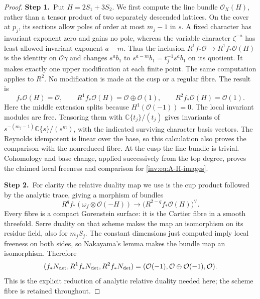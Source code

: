 \documentclass[11pt,a4paper]{article}
\theoremstyle{plain}
\theoremstyle{definition}
\begin{document}
\begin{proof}
\par\smallskip\noindent\textbf{Step 1.}\ Put $H=2S_1+3S_2$.  We first compute the line bundle $\mathcal O_X(H)$,
rather than a tensor product of two separately descended lattices.
On the cover at $p_j$, its sections allow poles of order at most $m_j-1$
in $s$.  A fixed character has invariant exponent zero and gains no
pole, whereas the variable character $\zeta^{-a}$ has least allowed
invariant exponent $a-m$.  Thus the inclusion
$R^1f_*\mathcal O\to R^1f_*\mathcal O(H)$ is the identity on $\mathcal O\gamma$ and
changes $s^ab_1$ to $s^{a-m}b_1=t_j^{-1}s^ab_1$ on its quotient.
It makes exactly one upper modification at each finite point.
The same computation applies to $R^2$.  No modification is made at
the cusp or a regular fibre.  The result is
\begin{equation}\label{inv:eq:A-H-images}
f_*\mathcal O(H)=\mathcal O,\qquad
R^1f_*\mathcal O(H)=\mathcal O\oplus\mathcal O(1),\qquad
R^2f_*\mathcal O(H)=\mathcal O(1).
\end{equation}
Here the middle extension splits because $H^1(\mathcal O(-1))=0$.
The local invariant modules are free.  Tensoring them with
$\mathbb C\{t_j\}/(t_j)$ gives invariants of
$s^{-(m_j-1)}\mathbb C\{s\}/(s^m)$, with the indicated surviving character
basis vectors.  The Reynolds idempotent is linear over the base,
so this calculation also proves the comparison with the nonreduced
fibre.  At the cusp the line bundle is trivial.  Cohomology and base
change, applied successively from the top degree, proves the claimed
local freeness and comparison for \eqref{inv:eq:A-H-images}.

\par\smallskip\noindent\textbf{Step 2.}\ For clarity the relative duality map we use is the cup product followed
by the analytic trace, giving a morphism of bundles
\[
R^qf_*(\omega_f\otimes\mathcal O(-H))\longrightarrow
\bigl(R^{2-q}f_*\mathcal O(H)\bigr)^\vee.
\]
Every fibre is a compact Gorenstein surface: it is the Cartier fibre
in a smooth threefold.  Serre duality on that scheme makes the map
an isomorphism on its residue field, also for $m_jS_j$.  The constant
dimensions just computed imply local freeness on both sides, so
Nakayama's lemma makes the bundle map an isomorphism.  Therefore
\begin{equation}\label{inv:eq:A-N-images}
(f_*N_{\rm det},R^1f_*N_{\rm det},R^2f_*N_{\rm det})
=(\mathcal O(-1),\mathcal O\oplus\mathcal O(-1),\mathcal O).
\end{equation}
This is the explicit reduction of analytic relative duality needed
here; the scheme fibre is retained throughout.


\end{proof}
\end{document}
